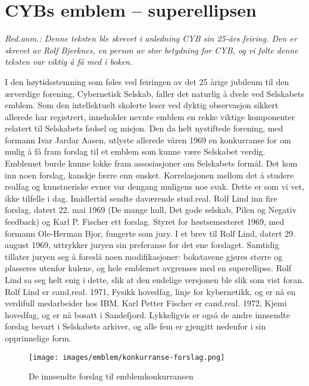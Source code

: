 \chapter{CYBs emblem -- superellipsen}

\author{Skrevet av Rolf Bjerknes}

\textit{Red.anm.: Denne teksten ble skrevet i anledning CYB sin 25-års feiring. Den er skrevet av Rolf Bjerknes, en person av stor betydning for CYB, og vi følte denne teksten var viktig å få med i boken.}

I den høytidsstemning som føles ved feiringen av det 25 årige jubileum til den ærverdige forening, Cybernetisk Selskab, faller det naturlig å dvele ved Selskabets emblem. Som den intellektuelt skolerte leser ved dyktig observasjon sikkert allerede har registrert, inneholder nevnte emblem en rekke viktige komponenter relatert til Selskabets fødsel og misjon. Den da helt nystiftede forening, med formann Ivar Jardar Aasen, utlyste allerede våren 1969 en konkurranse for om mulig å få fram forslag til et emblem som kunne være Selskabet verdig. Emblemet burde kunne lokke fram assosiasjoner om Selskabets formål. Det kom inn noen forslag, kanskje færre enn ønsket. Korrelasjonen mellom det å studere realfag og kunstneriske evner var dengang muligens noe svak. Dette er som vi vet, ikke tilfelle i dag. Imidlertid sendte daværende stud.real. Rolf Lind inn fire forslag, datert 22. mai 1969 (De mange hull, Det gode selskab, Pilen og Negativ feedback) og Karl P. Fischer ett forslag. Styret for høstsemesteret 1969, med formann Ole-Herman Bjor, fungerte som jury. I et brev til Rolf Lind, datert 29. august 1969, uttrykker juryen sin preferanse for det ene forslaget. Samtidig tillater juryen seg å foreslå noen modifikasjoner: bokstavene gjøres større og plasseres utenfor kulene, og hele emblemet avgrenses med en superellipse. Rolf Lind sa seg helt enig i dette, slik at den endelige versjonen ble slik som vist foran. Rolf Lind er cand.real. 1971, Fysikk hovedfag, linje for kybernetikk, og er nå en verdifull medarbeider hos IBM. Karl Petter Fischer er cand.real. 1972, Kjemi hovedfag, og er nå bosatt i Sandefjord. Lykkeligvis er også de andre innsendte forslag bevart i Selskabets arkiver, og alle fem er gjengitt nedenfor i sin opprinnelige form.

\begin{figure}
	\texttt{[image: images/emblem/konkurranse-forslag.png]}
	\label{fig:konkurranse-forslag}
	\caption{De innsendte forslag til emblemkonkurransen}
\end{figure}

